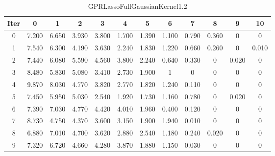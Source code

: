 \begin{table}
	\begin{center}
		\begin{tabular}{|c|c|c|c|c|c|c|c|c|c|c|c|}
			\hline
			Iter & 0 & 1 & 2 & 3 & 4 & 5 & 6 & 7 & 8 & 9 & 10 \\
			\hline
			0 & 7.200 & 6.650 & 3.930 & 3.800 & 1.700 & 1.390 & 1.100 & 0.790 & 0.360 & 0 & 0 \\
			\hline
			1 & 7.540 & 6.300 & 4.190 & 3.630 & 2.240 & 1.830 & 1.220 & 0.660 & 0.260 & 0 & 0.010 \\
			\hline
			2 & 7.440 & 6.080 & 5.590 & 4.560 & 3.800 & 2.240 & 0.640 & 0.330 & 0 & 0.020 & 0 \\
			\hline
			3 & 8.480 & 5.830 & 5.080 & 3.410 & 2.730 & 1.900 & 1 & 0 & 0 & 0 & 0 \\
			\hline
			4 & 9.870 & 8.030 & 4.770 & 3.820 & 2.770 & 1.820 & 1.240 & 0.110 & 0 & 0 & 0 \\
			\hline
			5 & 7.450 & 5.950 & 5.030 & 2.540 & 1.920 & 1.730 & 1.160 & 0.780 & 0 & 0.020 & 0 \\
			\hline
			6 & 7.390 & 7.030 & 4.770 & 4.420 & 4.010 & 1.960 & 0.400 & 0.120 & 0 & 0 & 0 \\
			\hline
			7 & 8.730 & 4.750 & 4.370 & 3.600 & 3.150 & 1.900 & 1.940 & 0.010 & 0 & 0 & 0 \\
			\hline
			8 & 6.880 & 7.010 & 4.700 & 3.620 & 2.880 & 2.540 & 1.180 & 0.240 & 0.020 & 0 & 0 \\
			\hline
			9 & 7.320 & 6.720 & 4.660 & 4.280 & 3.870 & 1.880 & 1.150 & 0.030 & 0 & 0 & 0 \\
			\hline
		\end{tabular}
	\end{center}
	\caption{GPRLassoFullGaussianKernel1.2}
\end{table}